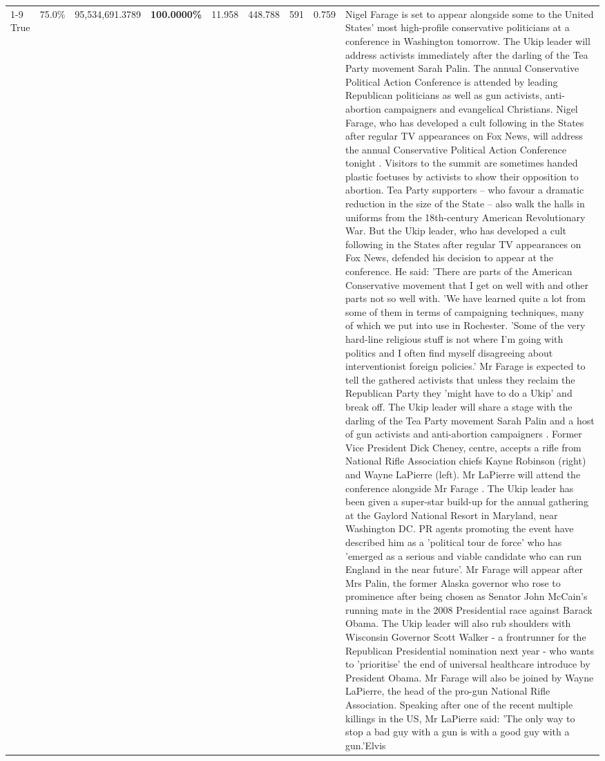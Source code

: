 \begin{table}[H]
\begin{tabular}{lllrlllll}
\cline{1-9}
True & 75.0\% & 95,534,691.3789 & \bfseries \color{red} 100.0000\% & 11.958 & 448.788 & 591 & 0.759 & Nigel Farage is set to appear alongside some to the United States' most high-profile conservative politicians at a conference in Washington tomorrow. The Ukip leader will address activists immediately after the darling of the Tea Party movement Sarah Palin. The annual Conservative Political Action Conference is attended by leading Republican politicians as well as gun activists, anti-abortion campaigners and evangelical Christians. Nigel Farage, who has developed a cult following in the States after regular TV appearances on Fox News, will address the annual Conservative Political Action Conference tonight . Visitors to the summit are sometimes handed plastic foetuses by activists to show their opposition to abortion. Tea Party supporters – who favour a dramatic reduction in the size of the State – also walk the halls in uniforms from the 18th-century American Revolutionary War. But the Ukip leader, who has developed a cult following in the States after regular TV appearances on Fox News, defended his decision to appear at the conference. He said: 'There are parts of the American Conservative movement that I get on well with and other parts not so well with. 'We have learned quite a lot from some of them in terms of campaigning techniques, many of which we put into use in Rochester. 'Some of the very hard-line religious stuff is not where I'm going with politics and I often find myself disagreeing about interventionist foreign policies.' Mr Farage is expected to tell the gathered activists that unless they reclaim the Republican Party they 'might have to do a Ukip' and break off. The Ukip leader will share a stage with the darling of the Tea Party movement Sarah Palin and a host of gun activists and anti-abortion campaigners . Former Vice President Dick Cheney, centre, accepts a rifle from National Rifle Association chiefs Kayne Robinson (right) and Wayne LaPierre (left). Mr LaPierre will attend the conference alongside Mr Farage . The Ukip leader has been given a super-star build-up for the annual gathering at the Gaylord National Resort in Maryland, near Washington DC. PR agents promoting the event have described him as a 'political tour de force' who has 'emerged as a serious and viable candidate who can run England in the near future'. Mr Farage will appear after Mrs Palin, the former Alaska governor who rose to prominence after being chosen as Senator John McCain's running mate in the 2008 Presidential race against Barack Obama. The Ukip leader will also rub shoulders with Wisconsin Governor Scott Walker - a frontrunner for the Republican Presidential nomination next year - who wants to 'prioritise' the end of universal healthcare introduce by President Obama. Mr Farage will also be joined by Wayne LaPierre, the head of the pro-gun National Rifle Association. Speaking after one of the recent multiple killings in the US, Mr LaPierre said: 'The only way to stop a bad guy with a gun is with a good guy with a gun.'Elvis \\

\end{tabular}
\end{table}
